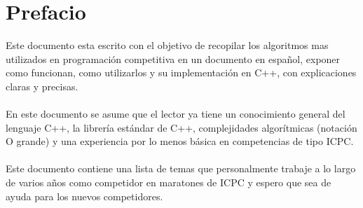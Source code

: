 \documentclass[12pt, a4paper]{article}
\begin{document}
	
	\section{Prefacio}
	
	
	Este documento esta escrito con el objetivo de recopilar los algoritmos mas utilizados en programación
	competitiva en un documento en español, exponer como funcionan, como utilizarlos y su implementación en C++, 
	con explicaciones claras y precisas.\\\\
	
	En este documento se asume que el lector ya tiene un conocimiento general del lenguaje C++, la librería estándar
	de C++, complejidades algorítmicas (notación O grande) y una experiencia por lo menos básica en competencias de
	tipo ICPC.\\\\
	
	Este documento contiene una lista de temas que personalmente trabaje a lo largo de
	varios años como competidor en maratones de ICPC y espero que sea de ayuda para los nuevos competidores.\\\\
	
	
\end{document}
